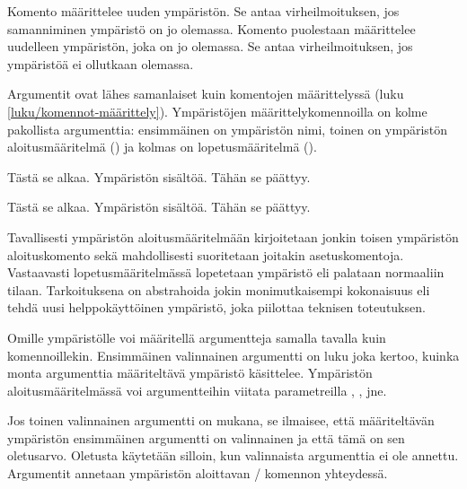 \noindent
Komento  määrittelee uuden ympäristön. Se antaa
virheilmoituksen, jos samanniminen ympäristö on jo olemassa. Komento
 puolestaan määrittelee uudelleen ympäristön,
joka on jo olemassa. Se antaa virheilmoituksen, jos ympäristöä ei
ollutkaan olemassa.

Argumentit ovat lähes samanlaiset kuin komentojen määrittelyssä (luku
\ref{luku/komennot-määrittely}). Ympäristöjen määrittelykomennoilla on
kolme pakollista argumenttia: ensimmäinen on ympäristön nimi, toinen on
ympäristön aloitusmääritelmä () ja kolmas on
lopetusmääritelmä ().

\begin{koodilohkosis}
\newenvironment{ymp}{Tästä se alkaa.}{Tähän se päättyy.}

\begin{ymp}
  Ympäristön sisältöä.
\end{ymp}
\end{koodilohkosis}

\begin{tulossis}
  Tästä se alkaa. Ympäristön sisältöä. Tähän se päättyy.
\end{tulossis}

\noindent
Tavallisesti ympäristön aloitusmääritelmään kirjoitetaan jonkin toisen
ympäristön aloituskomento sekä mahdollisesti suoritetaan joitakin
asetuskomentoja. Vastaavasti lopetusmääritelmässä lopetetaan ympäristö
eli palataan normaaliin tilaan. Tarkoituksena on abstrahoida jokin
monimutkaisempi kokonaisuus eli tehdä uusi helppokäyttöinen ympäristö, joka
piilottaa teknisen toteutuksen.

\begin{koodilohkosis}
\newenvironment{ymp}
{\begin{mahtavuus}
    \omia\hienoja\asetuksia}
  {\end{mahtavuus}}
\end{koodilohkosis}

\noindent
Omille ympäristölle voi määritellä argumentteja samalla tavalla kuin
komennoillekin. Ensimmäinen valinnainen argumentti  on luku
joka kertoo, kuinka monta argumenttia määriteltävä ympäristö käsittelee.
Ympäristön aloitusmääritelmässä voi argumentteihin viitata parametreilla
, ,  jne.

Jos toinen valinnainen argumentti  on mukana, se
ilmaisee, että määriteltävän ympäristön ensimmäinen argumentti on
valinnainen ja että tämä on sen oletusarvo. Oletusta käytetään silloin,
kun valinnaista argumenttia ei ole annettu. Argumentit annetaan
ympäristön aloittavan \-/ komennon yhteydessä.

